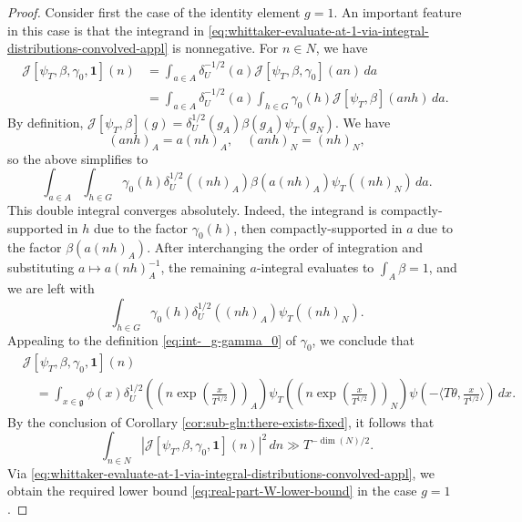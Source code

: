 \begin{proof}
  Consider first the case of the identity element $g = 1$.  An important feature in this case is that the integrand in \eqref{eq:whittaker-evaluate-at-1-via-integral-distributions-convolved-appl} is nonnegative.  For $n \in N$, we have
  \begin{align*}
    \mathcal{J}[\psi_T,\beta,\gamma_0,\mathbf{1}](n)
    &=
      \int_{a \in A} \delta_U^{-1/2}(a) \mathcal{J}[\psi_T, \beta, \gamma_0](a n) \, d a \\
    &=
      \int_{a \in A} \delta_U^{-1/2}(a)
      \int_{h \in G }  \gamma_0(h) \mathcal{J}[\psi_T,\beta](a n h) \, d a.\
  \end{align*}
  By definition, $\mathcal{J}[\psi_T,\beta](g) =  \delta_U^{1/2}(g_A) \beta(g_A) \psi_T(g_N)$.  We have
  \begin{equation*}
    (a n h)_A = a (n h)_A, \quad (a n h)_N = (n h)_N,
  \end{equation*}
  so the above simplifies to
  \begin{equation*}
    \int_{a \in A}
    \int_{h \in G} \gamma_0(h)
    \delta_U^{1/2}((n h)_A)
    \beta(a (n h)_A)
    \psi_T((n h)_N) \, d a.
  \end{equation*}
  This double integral converges absolutely.  Indeed, the integrand is compactly-supported in $h$ due to the factor $\gamma_0(h)$, then compactly-supported in $a$ due to the factor $\beta(a(n h)_A)$.  After interchanging the order of integration and substituting $a \mapsto a (n h)_A^{-1}$, the remaining $a$-integral evaluates to $\int_A \beta  = 1$, and we are left with
  \begin{equation*}
    \int_{h \in G} \gamma_0(h)
    \delta_U^{1/2}((n h)_A)
    \psi_T((n h)_N).
  \end{equation*}
  Appealing to the definition \eqref{eq:int-_g-gamma_0} of $\gamma_0$, we conclude that
  \begin{align*}
    &\mathcal{J}[\psi_T,\beta,\gamma_0, \mathbf{1}](n)   \\
    &\quad
      =
      \int_{x \in \mathfrak{g} }
      \phi (x) \delta_U^{1/2}((n \exp(\tfrac{x}{T^{1/2}}))_A) \psi_T ((n \exp(\tfrac{x}{T^{1/2} }))_N)
      \psi ( - \langle T \theta, \tfrac{x}{ T^{1/2} } \rangle) \, d x.
  \end{align*}
  By the conclusion of Corollary \ref{cor:sub-gln:there-exists-fixed}, it follows that
  \begin{equation*}
    \int_{n \in N} \left\lvert \mathcal{J}[\psi_T,\beta,\gamma_0, \mathbf{1}](n) \right\rvert^2 \, d n \gg T^{-\dim(N)/2}.
  \end{equation*}
  Via \eqref{eq:whittaker-evaluate-at-1-via-integral-distributions-convolved-appl}, we obtain the required lower bound \eqref{eq:real-part-W-lower-bound} in the case $g = 1$.


\end{proof}
